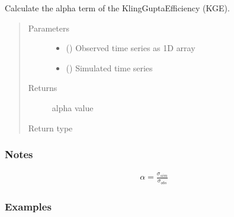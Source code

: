 \documentclass[letterpaper,10pt,english]{sphinxmanual}
\begin{document}
\begin{fulllineitems}
\label{\detokenize{reference/kge:de.kge.calc_kge_alpha}}
Calculate the alpha term of the Kling\sphinxhyphen{}Gupta\sphinxhyphen{}Efficiency (KGE).
\begin{quote}\begin{description}
\item[{Parameters}] \leavevmode\begin{itemize}
\item {} 
 (\sphinxstyleliteralemphasis{\sphinxupquote{(}}\sphinxstyleliteralemphasis{\sphinxupquote{,}}\sphinxstyleliteralemphasis{\sphinxupquote{)}}) \textendash{} Observed time series as 1\sphinxhyphen{}D array

\item {} 
 (\sphinxstyleliteralemphasis{\sphinxupquote{(}}\sphinxstyleliteralemphasis{\sphinxupquote{,}}\sphinxstyleliteralemphasis{\sphinxupquote{)}}) \textendash{} Simulated time series

\end{itemize}

\item[{Returns}] \leavevmode
{} \textendash{} alpha value

\item[{Return type}] \leavevmode
{}

\end{description}\end{quote}
\subsubsection*{Notes}
\begin{equation*}
\begin{split}\alpha = \frac{\sigma_{sim}}{\sigma_{obs}}\end{split}
\end{equation*}\subsubsection*{Examples}


\end{fulllineitems}
\end{document}
